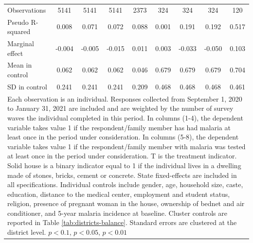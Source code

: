 {{\begin{tabular}{l*{8}{c}}
\hline
Observations    &\num{5141}         &\num{5141}         &\num{5141}         &\num{2373}         &\num{324}         &\num{324}         &\num{324}         &\num{120}         \\
Pseudo R-squared&    0.008         &    0.071         &    0.072         &    0.088         &    0.001         &    0.191         &    0.192         &    0.517         \\
Marginal effect &   -0.004         &   -0.005         &   -0.015         &    0.011         &    0.003         &   -0.033         &   -0.050         &    0.103         \\
Mean in control &    0.062         &    0.062         &    0.062         &    0.046         &    0.679         &    0.679         &    0.679         &    0.704         \\
SD in control   &    0.241         &    0.241         &    0.241         &    0.209         &    0.468         &    0.468         &    0.468         &    0.461         \\
\hline\hline
\multicolumn{9}{p{1.02\linewidth}}{\scriptsize Each observation is an individual. Responses collected from September 1, 2020 to January 31, 2021 are included and are weighted by the number of survey waves the individual completed in this period. In columns (1-4), the dependent variable takes value 1 if the respondent/family member has had malaria at least once in the period under consideration. In columns (5-8), the dependent variable takes value 1 if the respondent/family member with malaria was tested at least once in the period under consideration. T is the treatment indicator. Solid house is a binary indicator equal to 1 if the individual lives in a dwelling made of stones, bricks, cement or concrete. State fixed-effects are included in all specifications. Individual controls include gender, age, household size, caste, education, distance to the medical center, employment and student status, religion, presence of pregnant woman in the house, ownership of bednet and air conditioner, and 5-year malaria incidence at baseline. Cluster controls are reported in Table \ref{tab:districts-balance}. Standard errors are clustered at the district level.  \sym{*} \(p<0.1\), \sym{**} \(p<0.05\), \sym{***} \(p<0.01\)}\\
\end{tabular}
}%

}
